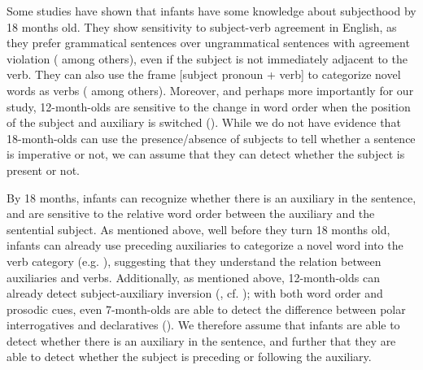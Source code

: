  Some studies have shown that infants have some knowledge about subjecthood by 18 months old. They show sensitivity to subject-verb agreement in English, as they prefer grammatical sentences over ungrammatical sentences with agreement violation (\cite{soderstrom2002agr, soderstrom2007sv, nazzi2011} among others), even if the subject is not immediately adjacent to the verb. They can also use the frame [subject pronoun + verb] to categorize novel words as verbs (\cite{babineau202014func,peterson2006aux, mintz2006verb,shi2014functional} among others). Moreover, and perhaps more importantly for our study, 12-month-olds are sensitive to the change in word order when the position of the subject and auxiliary is switched (\cite{geffenmintz2015wordorder}). While we do not have evidence that 18-month-olds can use the presence/absence of subjects to tell whether a sentence is imperative or not, we can assume that they can detect whether the subject is present or not.  %


 By 18 months, infants can recognize whether there is an auxiliary in the sentence, and are sensitive to the relative word order between the auxiliary and the sentential subject. As mentioned above, well before they turn 18 months old, infants can already use preceding auxiliaries to categorize a novel word into the verb category (e.g. \cite{peterson2006aux, mintz2006verb}), suggesting that they understand the relation between auxiliaries and verbs. Additionally, as mentioned above, 12-month-olds can already detect subject-auxiliary inversion (\cite{geffenmintz2015wordorder}, cf. \cite{erreich1984,ambridge2006auxinvert}); with both word order and prosodic cues, even 7-month-olds are able to detect the difference between polar interrogatives and declaratives (\cite{geffenmintz2011}). We therefore assume that infants are able to detect whether there is an auxiliary in the sentence, and further that they are able to detect whether the subject is preceding or following the auxiliary.

